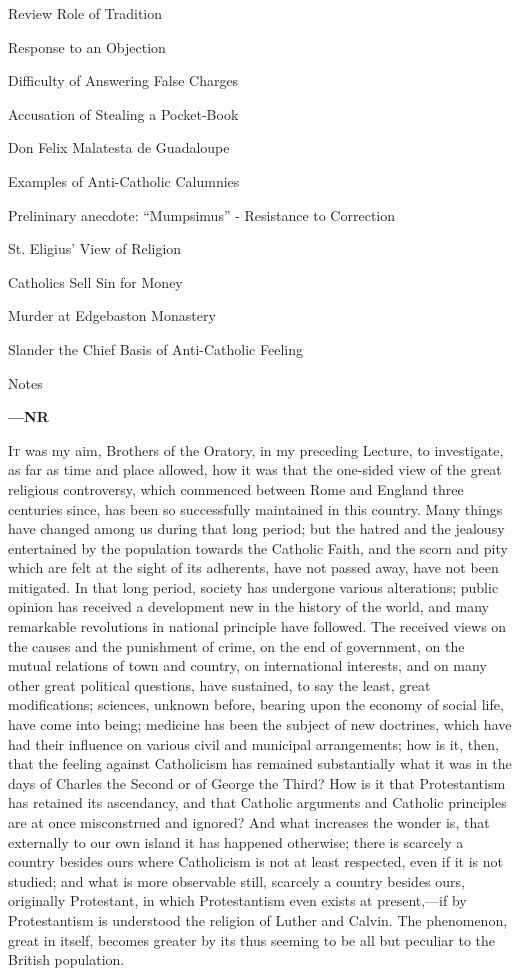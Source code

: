
Review Role of Tradition

Response to an Objection

Difficulty of Answering
False Charges

Accusation of
Stealing a Pocket-Book

Don Felix
Malatesta de Guadaloupe

Examples of Anti-Catholic
Calumnies

Prelininary
anecdote: ``Mumpsimus'' -
Resistance to Correction

St. Eligius' View of
Religion

Catholics Sell Sin for
Money

Murder at
Edgebaston Monastery

Slander the Chief Basis of
Anti-Catholic Feeling

Notes

\textbf{—NR}

I\textsc{t} was my aim, Brothers of the Oratory, in my
preceding Lecture, to investigate, as far as time and
place allowed, how it was that the one-sided view of the
great religious controversy, which commenced between Rome
and England three centuries since, has been so
successfully maintained in this country. Many things have
changed among us during that long period; but the hatred
and the jealousy entertained by the population towards
the Catholic Faith, and the scorn and pity which are felt
at the sight of its adherents, have not passed away, have
not been mitigated. In that long period, society has
undergone various alterations; public opinion has
received a development new in the history of the world,
and many remarkable revolutions in national principle
have followed. The received views on the causes and the
punishment of crime, on the end of government, on the
mutual relations of town and country, on international
interests, and on many other great political questions,
have sustained, to say the least, great modifications;
sciences, unknown before, bearing upon the economy of
social life, have come into being; medicine has been the
subject of new doctrines, which have had their influence
on various civil and municipal arrangements; how is it,
then, that the feeling against Catholicism has remained
substantially what it was in the days of Charles the
Second or of George the Third? How is it that
Protestantism has retained its ascendancy, and that
Catholic arguments and Catholic principles are at once
misconstrued and ignored? And what increases the wonder
is, that externally to our own island it has happened
otherwise; there is scarcely a country besides ours where
Catholicism is not at least respected, even if it is not
studied; and what is more observable still, scarcely a
country besides ours, originally Protestant, in which
Protestantism even exists at present,—if by
Protestantism is understood the religion of Luther and
Calvin. The phenomenon, great in itself, becomes greater
by its thus seeming to be all but peculiar to the British
population.

